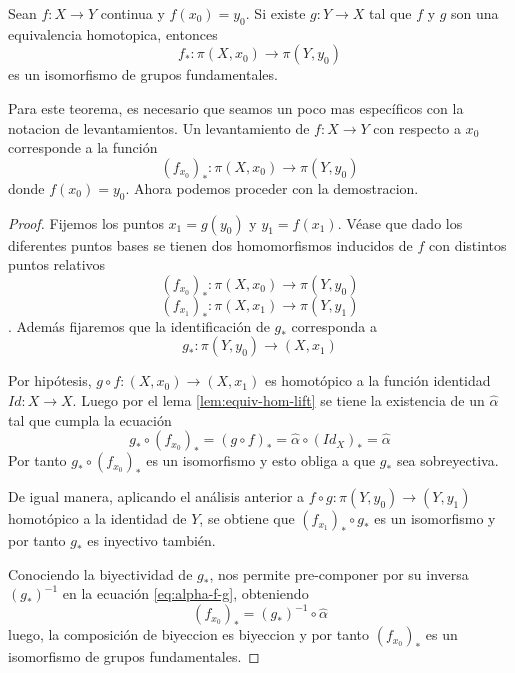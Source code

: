\begin{teorema}
  Sean \(f : X \to Y\) continua y \(f (x_0) = y_0\). Si existe \(g : Y
  \to X\) tal que \(f\) y \(g\) son una equivalencia homotopica, entonces
  \[ f_* : \pi (X, x_0) \to \pi (Y, y_0)\]
  es un isomorfismo de grupos fundamentales.
\end{teorema}
\noindent Para este teorema, es necesario que seamos un poco mas
específicos con la notacion de levantamientos. Un levantamiento de \(f :
X \to Y\) con respecto a \(x_0\) corresponde a la función
\[ (f_{x_0})_{*} : \pi (X , x_0) \to \pi (Y, y_0)\]
donde \(f(x_0) = y_0\). Ahora podemos proceder con la demostracion.
\begin{proof}
  Fijemos los puntos \(x_1 = g(y_0)\) y \(y_1 = f(x_1)\). Véase que dado
  los diferentes puntos bases se tienen dos homomorfismos inducidos de
  \(f\) con distintos puntos relativos
  \[(f_{x_0})_* : \pi (X, x_0) \to \pi (Y, y_0)\]
  \[(f_{x_1})_* : \pi (X, x_1) \to \pi (Y, y_1)\].
  Además fijaremos que la identificación de \(g_*\) corresponda a
  \[ g_* : \pi (Y, y_0) \to (X, x_1) \]

  Por hipótesis, \(g \circ f : (X, x_0) \to (X, x_1)\) es homotópico a
  la función identidad \(Id : X \to X\). Luego por el lema
  \ref{lem:equiv-hom-lift} se tiene la existencia de un \(\hat \alpha\)
  tal que cumpla la ecuación
  \begin{equation} \label{eq:alpha-f-g}
  g_* \circ (f_{x_0})_* = (g \circ f)_* = \hat \alpha \circ (Id_X)_*
    = \hat \alpha
  \end{equation}
  Por tanto \(g_* \circ (f_{x_0})_*\) es un isomorfismo y esto obliga a
  que \(g_*\) sea sobreyectiva.

  De igual manera, aplicando el análisis anterior a \(f \circ g : \pi
  (Y, y_0) \to (Y, y_1)\) homotópico a la identidad de \(Y\), se
  obtiene que \((f_{x_1})_* \circ g_*\) es un isomorfismo y por tanto
  \(g_*\) es inyectivo también.

  Conociendo la biyectividad de \(g_*\), nos permite pre-componer por su
  inversa \((g_*)^{-1}\) en la ecuación \eqref{eq:alpha-f-g}, obteniendo
  \[ (f_{x_0})_* = (g_*)^{-1} \circ \hat \alpha\]
  luego, la composición de biyeccion es biyeccion y por tanto
  \((f_{x_0})_*\) es un isomorfismo de grupos fundamentales.
\end{proof}

